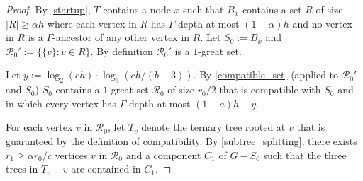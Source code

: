\documentclass{patmorin}
\begin{document}
\begin{proof}
  By \cref{startup}, $T$ contains a node $x$ such that $B_x$ contains a set $R$ of size $|R|\ge \alpha h$ where each vertex in $R$ has $\Gamma$-depth at most $(1-\alpha)h$ and no vertex in $R$ is a $\Gamma$-ancestor of any other vertex in $R$.  Let $S_0:=B_x$ and $\mathcal{R}_0':=\{\{v\}:v\in R\}$.  By definition $\mathcal{R}_0'$ is a $1$-great set.



  Let $y:=\log_2(ch)\cdot\log_3(ch/(b-3))$.  By \cref{compatible_set} (applied to $\mathcal{R}_0'$ and $S_0$) $S_0$ contains a $1$-great set $\mathcal{R}_0$ of size $r_0/2$ that is compatible with $S_0$ and in which every vertex has $\Gamma$-depth at most $(1-a)h+y$.  

  For each vertex $v$ in $\mathcal{R}_0$, let $T_v$ denote the ternary tree rooted at $v$ that is guaranteed by the definition of compatibility. By \cref{subtree_splitting}, there exists $r_1\ge \alpha r_0/c$ vertices $v$ in $\mathcal{R}_0$ and a component $C_1$ of $G-S_0$ such that the three trees in $T_v-v$ are contained in $C_1$.  


\end{proof}
\end{document}
